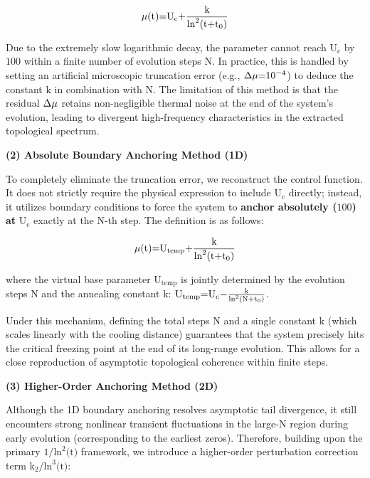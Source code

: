 \documentclass[fleqn,10pt]{wlscirep}
\begin{document}
\[\text{\ensuremath{\mu}}\text{(}\text{t}\text{)=}\text{U}_{\text{c}}\text{+}\frac{\text{k}}{\text{ln}^{\text{2}}\text{(}\text{t}\text{+}\text{t}_{\text{0}}\text{)}}\]

Due to the extremely slow logarithmic decay, the parameter cannot reach
\(\text{U}_{\text{c}}\) by \(\text{100}\) within a finite number of
evolution steps \(\text{N}\). In practice, this is handled by setting an
artificial microscopic truncation error (e.g.,
\(\text{\ensuremath{\Delta}}\text{\ensuremath{\mu}}\text{=}\text{10}^{\text{\ensuremath{-}4}}\)) to deduce the
constant \(\text{k}\) in combination with \(\text{N}\). The limitation
of this method is that the residual \(\text{\ensuremath{\Delta}}\text{\ensuremath{\mu}}\) retains
non-negligible thermal noise at the end of the system's evolution,
leading to divergent high-frequency characteristics in the extracted
topological spectrum.

\textbf{(2) Absolute Boundary Anchoring Method (1D)}

To completely eliminate the truncation error, we reconstruct the control
function. It does not strictly require the physical expression to
include \(\text{U}_{\text{c}}\) directly; instead, it utilizes boundary
conditions to force the system to \textbf{anchor absolutely
(}\(\text{100}\)\textbf{) at} \(\text{U}_{\text{c}}\) exactly at the
\(\text{N}\)-th step. The definition is as follows:

\[\text{\ensuremath{\mu}}\text{(}\text{t}\text{)=}\text{U}_{\text{temp}}\text{+}\frac{\text{k}}{\text{ln}^{\text{2}}\text{(}\text{t}\text{+}\text{t}_{\text{0}}\text{)}}\]

where the virtual base parameter \(\text{U}_{\text{temp}}\) is jointly
determined by the evolution steps \(\text{N}\) and the annealing
constant \(\text{k}\):
\(\text{U}_{\text{temp}}\text{=}\text{U}_{\text{c}}\text{\ensuremath{-}}\frac{\text{k}}{\text{ln}^{\text{2}}\text{(}\text{N}\text{+}\text{t}_{\text{0}}\text{)}}\).

Under this mechanism, defining the total steps \(\text{N}\) and a single
constant \(\text{k}\) (which scales linearly with the cooling distance)
guarantees that the system precisely hits the critical freezing point at
the end of its long-range evolution. This allows for a close
reproduction of asymptotic topological coherence within finite steps.

\textbf{(3) Higher-Order Anchoring Method (2D)}

Although the 1D boundary anchoring resolves asymptotic tail divergence,
it still encounters strong nonlinear transient fluctuations in the
large-N region during early evolution (corresponding to the earliest
zeros). Therefore, building upon the primary
\(\text{1/}\text{ln}^{\text{2}}\text{(}\text{t}\text{)}\) framework, we
introduce a higher-order perturbation correction term
\(\text{k}_{\text{2}}\text{/}\text{ln}^{\text{3}}\text{(}\text{t}\text{)}\):
\end{document}
